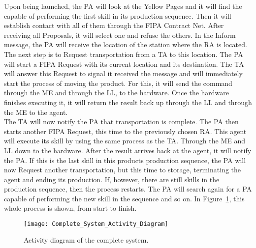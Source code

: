 Upon being launched, the \acrshort{PA} will look at the Yellow Pages and it will find the  capable of performing the first skill in its production sequence. Then it will establish contact with all of them through the \acrshort{FIPA} Contract Net. After receiving all Proposals, it will select one and refuse the others. In the Inform message, the \acrshort{PA} will receive the location of the station where the \acrshort{RA} is located.\\

The next step is to Request transportation from a \acrshort{TA} to this location. The \acrshort{PA} will start a \acrshort{FIPA} Request with its current location and its destination. The \acrshort{TA} will answer this Request to signal it received the message and will immediately start the process of moving the product. For this, it will send the command through the \acrlong{ME} and through the \acrlong{LL}, to the hardware. Once the hardware finishes executing it, it will return the result back up through the \acrshort{LL} and through the \acrshort{ME} to the agent.\\

The \acrshort{TA} will now notify the \acrshort{PA} that transportation is complete. The \acrshort{PA} then starts another \acrshort{FIPA} Request, this time to the previously chosen \acrshort{RA}. This agent will execute its skill by using the same process as the \acrshort{TA}. Through the \acrshort{ME} and \acrshort{LL} down to the hardware. After the result arrives back at the agent, it will notify the \acrshort{PA}. If this is the last skill in this products production sequence, the \acrshort{PA} will now Request another transportation, but this time to storage, terminating the agent and ending its production. If, however, there are still skills in the production sequence, then the process restarts. The \acrshort{PA} will search again for a \acrshort{PA} capable of performing the new skill in the sequence and so on. In Figure~\ref{fig:complete_activity_diagram}, this whole process is shown, from start to finish.\\

\begin{figure}[h!]
	\centering
	\texttt{[image: Complete\_System\_Activity\_Diagram]}
	\caption{Activity diagram of the complete system.}
	\label{fig:complete_activity_diagram}
\end{figure}
